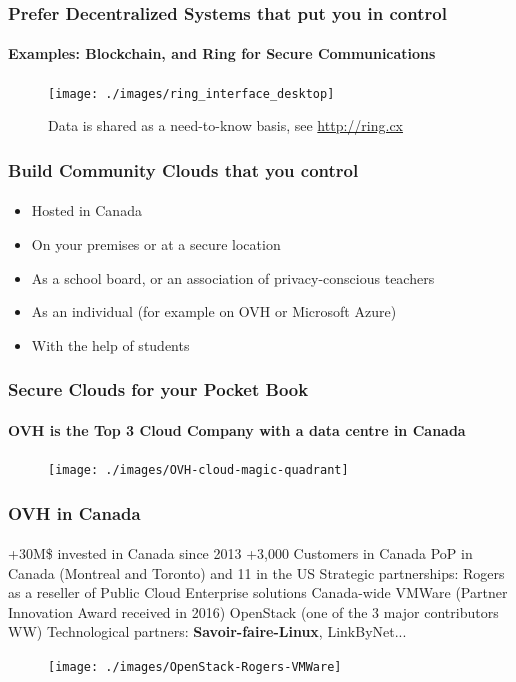 	\begin{frame}
	\frametitle{Prefer Decentralized Systems that put you in control}
	\framesubtitle{Examples: Blockchain, and Ring for Secure Communications}
	        \begin{figure}[h]
                \centering
                \texttt{[image: ./images/ring\_interface\_desktop]}
		\caption{Data is shared as a need-to-know basis, see \url{http://ring.cx}}
        	\end{figure}
	\end{frame}

	\begin{frame}
	\frametitle{Build Community Clouds that you control}
	\framesubtitle{}
		\begin{itemize}[<+->]
			\item Hosted in Canada
			\item On your premises or at a secure location
			\item As a school board, or an association of privacy-conscious teachers
			\item As an individual (for example on OVH or Microsoft Azure)
			\item With the help of students 
		\end{itemize}
	\end{frame}

	\begin{frame}
	\frametitle{Secure Clouds for your Pocket Book}
	\framesubtitle{OVH is the Top 3 Cloud Company with a data centre in Canada}
	        \begin{figure}[h]
                \centering
                \texttt{[image: ./images/OVH-cloud-magic-quadrant]}
        	\end{figure}
	\end{frame}

	\begin{frame}
	\frametitle{OVH in Canada}
	\framesubtitle{}
		\begin{outline}
			\1 +30M\$ invested in Canada since 2013 
			\1 +3,000 Customers in Canada
			 PoP in Canada (Montreal and Toronto) and 11 in the US
			\1 Strategic partnerships:
				\2 Rogers as a reseller of Public Cloud Enterprise solutions Canada-wide 
				\2 VMWare (Partner Innovation Award received in 2016)
				\2 OpenStack (one of the 3 major contributors WW)
			\1 Technological partners: \textbf{Savoir-faire-Linux}, LinkByNet...%
		\end{outline}
	        \begin{figure}[h]
                \centering
                \texttt{[image: ./images/OpenStack-Rogers-VMWare]}
        	\end{figure}
	\end{frame}

